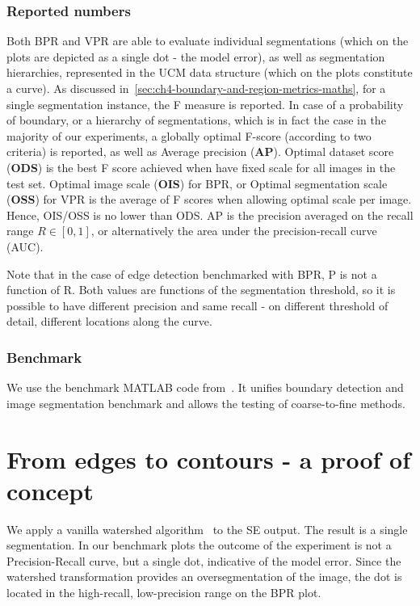 \subsubsection*{Reported numbers}
Both BPR and VPR are able to evaluate individual segmentations (which on the plots are depicted as a single dot - the model error), as well as segmentation hierarchies, represented in the UCM data structure (which on the plots constitute a curve). As discussed in~\ref{sec:ch4-boundary-and-region-metrics-maths}, for a single segmentation instance, the F measure is reported. 
In case of a probability of boundary, or a hierarchy of segmentations, which is in fact the case in the majority of our experiments, a globally optimal F-score (according to two criteria) is reported, as well as Average precision (\textbf{AP}). 
Optimal dataset score (\textbf{ODS}) is the best F score achieved when have fixed scale for all images in the test set. 
Optimal image scale (\textbf{OIS}) for BPR, or Optimal segmentation scale (\textbf{OSS}) for VPR is the average of F scores when allowing optimal scale per image. Hence, OIS\slash OSS is no lower than ODS. 
AP is the precision averaged on the recall range $R\in[0,1]$, or alternatively the area under the precision-recall curve (AUC).

Note that in the case of edge detection benchmarked with BPR, P is not a function of R. Both values are functions of the segmentation threshold, so it is possible to have different precision and same recall - on different threshold of detail, \ie different locations along the curve.

\subsubsection*{Benchmark}
We use the benchmark MATLAB code from~\cite{Galasso13Benchmark}. %
It unifies boundary detection and image segmentation benchmark and allows the testing of coarse-to-fine methods. %

\section{From edges to contours - a proof of concept}
We apply a vanilla watershed algorithm~\cite{beucher1992morphological,najman1996geodesic,PINKlibrary} to the SE output. The result is a single segmentation. 
In our benchmark plots the outcome of the experiment is not a Precision-Recall curve, but a single dot, indicative of the model error. Since the watershed transformation provides an oversegmentation of the image, the dot is located in the high-recall, low-precision range on the BPR plot.
 
